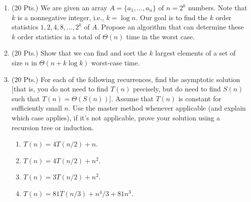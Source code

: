 \begin{enumerate}
\item (20 Pts.) We are given an array $A=\{a_1,...,a_n\}$ of $n=2^k$
  numbers. Note that $k$ is a nonnegative integer, i.e., $k = \log n$.
  Our goal is to find the $k$ order statistics $1, 2, 4,
  8,...,2^k$ of $A$. Propose an algorithm that can determine these $k$ order
  statistics in a total of $\Theta(n)$ time in the worst case.

\item (20 Pts.)  Show that we can find and sort the $k$ largest
  elements of a set of size $n$ in $\Theta(n+k\log k)$ worst-case
  time.

\item (20  Pts.) For each  of  the following  recurrences,  find the  asymptotic
  solution [that is, you do not  need to find $T(n)$ precisely, but do
  need  to find  $S(n)$  such that  $T(n)=\Theta(S(n))$]. Assume  that
  $T(n)$  is constant  for  sufficiently small  $n$.   Use the  master
  method whenever applicable (and explain which case applies), if it's
  not applicable, prove your solution using a recursion tree or induction.
\begin{enumerate}
  \item $T(n)=4T(n/2) + n$.
  \item $T(n)=4T(n/2) + n^2$.
  \item $T(n)= 3T(n/2) + n^2$.
 \item $T(n)= 81T(n/3)+ n^4/3+ 81n^3$. 

\end{enumerate}
\end{enumerate}







